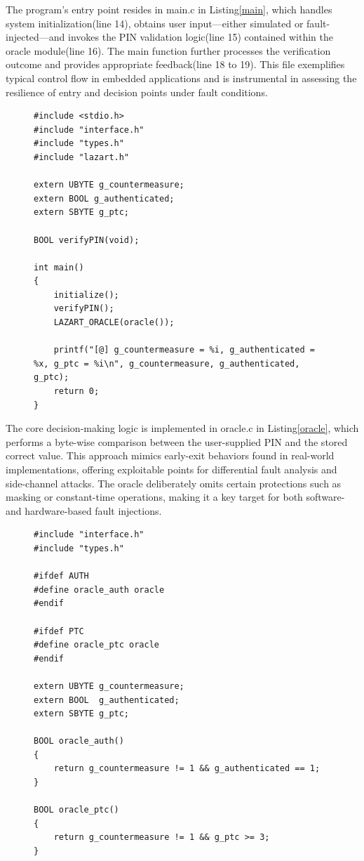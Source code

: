 The program’s entry point resides in main.c in Listing\ref{main}, which handles system initialization(line 14), obtains user input—either simulated or fault-injected—and invokes the PIN validation logic(line 15) contained within the oracle module(line 16). The main function further processes the verification outcome and provides appropriate feedback(line 18 to 19). This file exemplifies typical control flow in embedded applications and is instrumental in assessing the resilience of entry and decision points under fault conditions.
\begin{figure}
\begin{lstlisting}[caption={main.c of VerifyPin function in benchmark V0}, label={main}, basicstyle=\ttfamily\footnotesize]
#include <stdio.h>
#include "interface.h"
#include "types.h"
#include "lazart.h"

extern UBYTE g_countermeasure;
extern BOOL g_authenticated;
extern SBYTE g_ptc;

BOOL verifyPIN(void);

int main()
{
    initialize();
    verifyPIN();
    LAZART_ORACLE(oracle());
    
    printf("[@] g_countermeasure = %i, g_authenticated = %x, g_ptc = %i\n", g_countermeasure, g_authenticated, g_ptc);
    return 0;
}
\end{lstlisting}
\end{figure}
The core decision-making logic is implemented in oracle.c in Listing\ref{oracle}, which performs a byte-wise comparison between the user-supplied PIN and the stored correct value. This approach mimics early-exit behaviors found in real-world implementations, offering exploitable points for differential fault analysis and side-channel attacks. The oracle deliberately omits certain protections such as masking or constant-time operations, making it a key target for both software- and hardware-based fault injections.
\begin{figure}
\begin{lstlisting}[caption={oracle.c of VerifyPin function in benchmark V0}, label={oracle}, basicstyle=\ttfamily\footnotesize]
#include "interface.h"
#include "types.h"

#ifdef AUTH
#define oracle_auth oracle
#endif

#ifdef PTC
#define oracle_ptc oracle
#endif

extern UBYTE g_countermeasure;
extern BOOL  g_authenticated;
extern SBYTE g_ptc;

BOOL oracle_auth()
{
    return g_countermeasure != 1 && g_authenticated == 1;
}

BOOL oracle_ptc()
{
    return g_countermeasure != 1 && g_ptc >= 3;
}
\end{lstlisting}
\end{figure}
